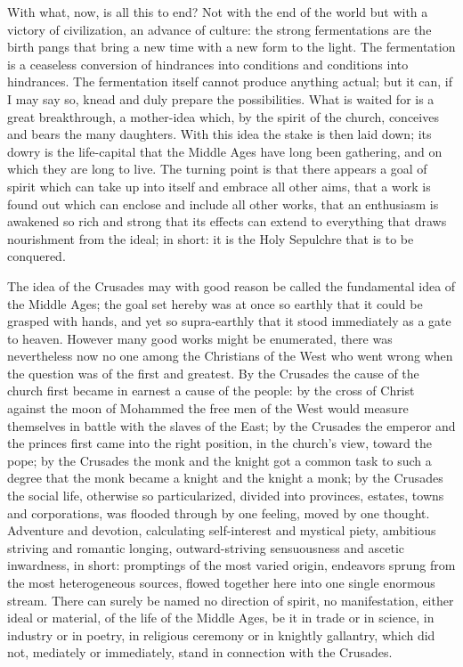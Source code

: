 \documentclass[12pt]{book}
\newcommand{\opage}[1]{\marginnote{\footnotesize\textit{[#1]}}}
\begin{document}
With what, now, is all this to end? Not with the end of the world but
with a victory of civilization, an advance of culture: the strong
fermentations are the birth pangs that bring a new time with a new form
to the light. The fermentation is a ceaseless conversion of hindrances
into conditions and conditions into hindrances. The fermentation itself
cannot produce anything actual; but it can, if I may say so, knead and
duly prepare the possibilities. What is waited for is a great
breakthrough,
\opage{29}\setcounter{footnote}{0}%
a mother-idea which, by the spirit of the church, conceives and bears
the many daughters. With this idea the stake is then laid down; its
dowry is the life-capital that the Middle Ages have long been gathering,
and on which they are long to live. The turning point is that there
appears a goal of spirit which can take up into itself and embrace all
other aims, that a work is found out which can enclose and include all
other works, that an enthusiasm is awakened so rich and strong that its
effects can extend to everything that draws nourishment from the ideal;
in short: it is the Holy Sepulchre that is to be conquered.

The idea of the Crusades may with good reason be called the fundamental
idea of the Middle Ages; the goal set hereby was at once so earthly that
it could be grasped with hands, and yet so supra-earthly that it stood
immediately as a gate to heaven. However many good works might be
enumerated, there was nevertheless now no one among the Christians of
the West who went wrong when the question was of the first and
greatest. By the Crusades the cause of the church first became in
earnest a cause of the people: by the cross of Christ against the moon
of Mohammed the free men of the West would measure themselves in battle
with the slaves of the East; by the Crusades the emperor and the princes
first came into the right position, in the church's view, toward the
pope; by the Crusades the monk and the knight got a common task to such
a degree that the monk became a knight and the knight a monk; by the
Crusades the social life, otherwise so particularized, divided into
provinces, estates, towns and corporations, was flooded through by one
feeling, moved by one thought. Adventure and devotion, calculating
self-interest and mystical piety, ambitious striving and romantic
longing, outward-striving sensuousness and ascetic inwardness, in short:
promptings of the most varied origin, endeavors sprung from the
\opage{30}\setcounter{footnote}{0}%
most heterogeneous sources, flowed together here into one single
enormous stream. There can surely be named no direction of spirit, no
manifestation, either ideal or material, of the life of the Middle Ages,
be it in trade or in science, in industry or in poetry, in religious
ceremony or in knightly gallantry, which did not, mediately or
immediately, stand in connection with the Crusades.
\end{document}
